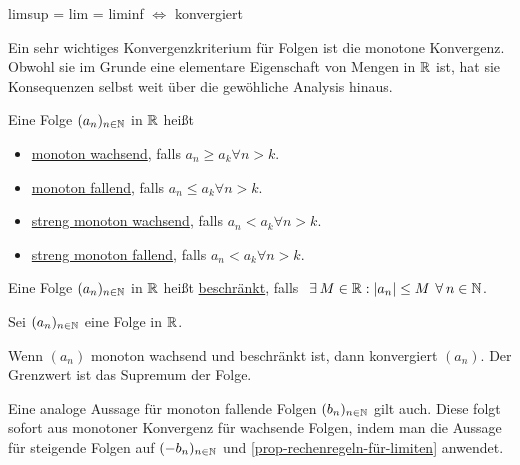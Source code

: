\begin{lemma}
    limsup = lim = liminf $\iff$ konvergiert
\end{lemma}

Ein sehr wichtiges Konvergenzkriterium für Folgen ist die monotone Konvergenz. Obwohl sie im Grunde eine elementare Eigenschaft von Mengen in $\mathbb{R}$ ist, hat sie Konsequenzen selbst weit über die gewöhliche Analysis hinaus.

\begin{definition}
    Eine Folge $(a_n)_{n \in \mathbb{N}}$ in $\mathbb{R}$ heißt
    \begin{itemize}
        \item \underline{monoton wachsend}, falls $a_n \geq a_k \forall n > k$.
        \item \underline{monoton fallend}, falls $a_n \leq a_k \forall n > k$.
        \item \underline{streng monoton wachsend}, falls $a_n < a_k \forall n > k$.
        \item \underline{streng monoton fallend}, falls $a_n < a_k \forall n > k$.
    \end{itemize}
\end{definition}

\begin{definition}
    Eine Folge $(a_n)_{n \in \mathbb{N}}$ in $\mathbb{R}$ heißt \underline{beschränkt}, falls $\exists M \in \R: |a_n| \leq M \forall n \in \N$.
\end{definition}

\begin{proposition}
    \label{prop-monotone-konvergenz-für-folgen}
    Sei $(a_n)_{n \in \mathbb{N}}$ eine Folge in $\mathbb{R}$.

    Wenn $(a_n)$ monoton wachsend und beschränkt ist, dann konvergiert $(a_n)$. Der Grenzwert ist das Supremum der Folge.
\end{proposition}

Eine analoge Aussage für monoton fallende Folgen $(b_n)_{n \in \mathbb{N}}$ gilt auch. Diese folgt sofort aus monotoner Konvergenz für wachsende Folgen, indem man die Aussage für steigende Folgen auf $(-b_n)_{n \in \mathbb{N}}$ und \ref{prop-rechenregeln-für-limiten} anwendet.

